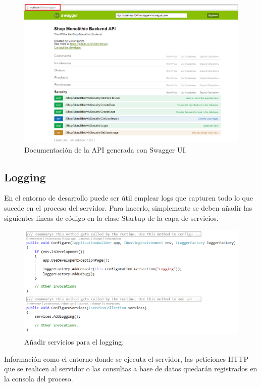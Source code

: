 \documentclass[11pt,spanish,listoffigures]{tfgetsinf}
\begin{document}
\begin{figure}[h]
\centering
\includegraphics[scale=0.4]{SwaggerAPI}
\caption{Documentación de la API generada con Swagger UI.}
\end{figure}

\subsection{Logging}
En el entorno de desarrollo puede ser útil emplear logs que capturen todo lo que sucede en el proceso del servidor. Para hacerlo, simplemente se deben añadir las siguientes líneas de código en la clase Startup de la capa de servicios.

\begin{figure}[h]
\centering
\includegraphics[scale=0.7]{loggingDev}
\caption{Añadir servicios para el logging.}
\end{figure}

Información como el entorno donde se ejecuta el servidor, las peticiones HTTP que se realicen al servidor o las consultas a base de datos quedarán registrados en la consola del proceso.
\end{document}
